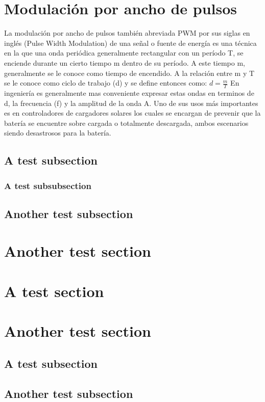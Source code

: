\documentclass[titlepage]{article} %
\newcommand*\rbreak{\par\noindent\linebreak} %
\begin{document}

\tableofcontents
\clearpage

\section{Modulación por ancho de pulsos}
        La modulación por ancho de pulsos también abreviada PWM por sus siglas en inglés (Pulse Width Modulation) de 
        una señal o fuente de energía es una técnica en la que una onda periódica generalmente rectangular con un período T, 
        se enciende durante un cierto tiempo m dentro de su período. A este tiempo m, generalmente se le conoce como tiempo de
        encendido. A la relación entre m y T se le conoce como ciclo de trabajo (d) y se define entonces como:
        $ d = \frac{m}{T}$ En ingeniería es generalmente mas conveniente expresar estas ondas en terminos de d, la frecuencia (f) 
        y la amplitud de la onda A. Uno de sus usos más importantes es en controladores de cargadores solares los cuales se encargan 
        de prevenir que la batería se encuentre sobre cargada o totalmente descargada, ambos escenarios siendo desastrosos para la batería.
	\subsection{A test subsection}
		\blindtext
		\subsubsection{A test subsubsection}
			\blindtext \rbreak 
			\blindtext \rbreak
			\blindtext
		\subsection{Another test subsection}
			\blindtext
	\section{Another test section}
		\blindtext
	\section{A test section}
		\blindtext
	\section{Another test section}
		\blindtext
		\subsection{A test subsection}
			\blindtext
		\subsection{Another test subsection}
			\blindtext
\end{document}
